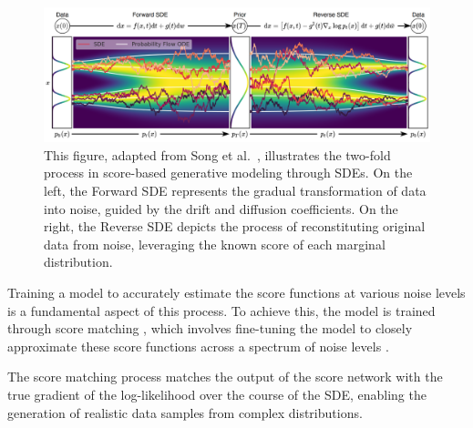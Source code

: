 \begin{figure}[ht]
  \centering
    \includegraphics[width=1\columnwidth]{figures/DiffusionModels_SDEs.png}
    \caption{This figure, adapted from Song et al.~\citep{song2020score}, illustrates the two-fold process in score-based generative modeling through SDEs. On the left, the Forward SDE represents the gradual transformation of data into noise, guided by the drift and diffusion coefficients. On the right, the Reverse SDE depicts the process of reconstituting original data from noise, leveraging the known score of each marginal distribution.}\label{fig:DM_SDEs}
\end{figure}

Training a model to accurately estimate the score functions at various noise levels is a fundamental aspect of this process. To achieve this, the model is trained through score matching \citep{hyvarinenScoreMatching}, which involves fine-tuning the model to closely approximate these score functions across a spectrum of noise levels \citep{song2020score}. 

 
 The score matching process matches the output of the score network with the true gradient of the log-likelihood over the course of the SDE, enabling the generation of realistic data samples from complex distributions.